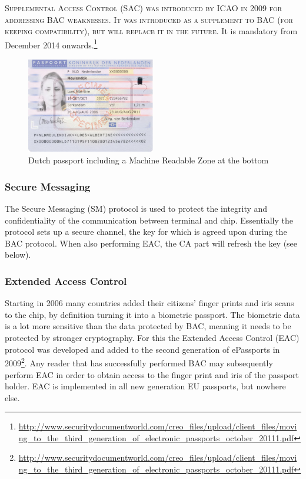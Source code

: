 \textsc{Supplemental Access Control (SAC) was introduced by ICAO in 2009 for addressing BAC weaknesses. It was introduced as a supplement to BAC (for keeping compatibility), but will replace it in the future.} It is mandatory from December 2014 onwards.\footnote{\url{http://www.securitydocumentworld.com/creo_files/upload/client_files/moving_to_the_third_generation_of_electronic_passports_october_20111.pdf}}

\begin{figure}[htb]
	\centering
		\includegraphics[width=0.50\textwidth]{images/dutchpassport.png}
	\caption{Dutch passport including a Machine Readable Zone at the bottom}
	\label{fig:dutchpassport}
\end{figure}

\subsubsection{Secure Messaging}
The Secure Messaging (SM) protocol is used to protect the integrity and confidentiality of the communication between terminal and chip. Essentially the protocol sets up a secure channel, the key for which is agreed upon during the BAC protocol. When also performing EAC, the CA part will refresh the key (see below).

\subsubsection{Extended Access Control}
Starting in 2006 many countries added their citizens' finger prints and iris scans to the chip, by definition turning it into a biometric passport. The biometric data is a lot more sensitive than the data protected by BAC, meaning it needs to be protected by stronger cryptography. For this the Extended Access Control (EAC) protocol was developed and added to the second generation of ePassports in 2009\footnote{\url{http://www.securitydocumentworld.com/creo_files/upload/client_files/moving_to_the_third_generation_of_electronic_passports_october_20111.pdf}}. Any reader that has successfully performed BAC may subsequently perform EAC in order to obtain access to the finger print and iris of the passport holder. EAC is implemented in all new generation EU passports, but nowhere else.

